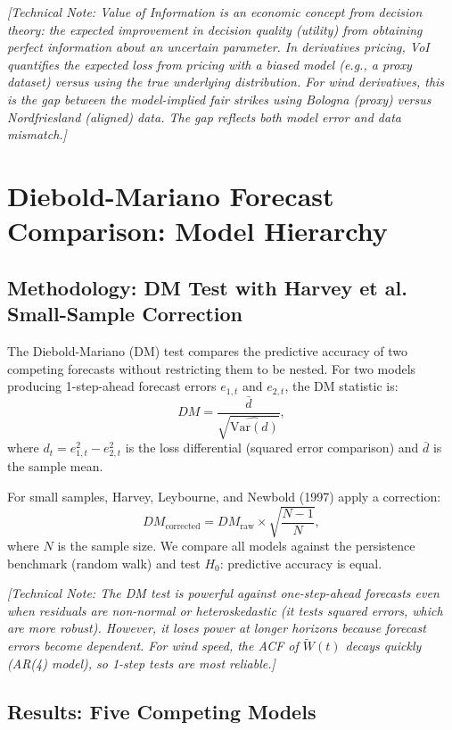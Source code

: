 \documentclass[11pt, a4paper, twoside]{article}
\begin{document}
\textit{[Technical Note: Value of Information is an economic concept from decision theory: the expected improvement in decision quality (utility) from obtaining perfect information about an uncertain parameter. In derivatives pricing, VoI quantifies the expected loss from pricing with a biased model (e.g., a proxy dataset) versus using the true underlying distribution. For wind derivatives, this is the gap between the model-implied fair strikes using Bologna (proxy) versus Nordfriesland (aligned) data. The gap reflects both model error and data mismatch.]}

\section{Diebold-Mariano Forecast Comparison: Model Hierarchy}

\subsection{Methodology: DM Test with Harvey et al. Small-Sample Correction}

The Diebold-Mariano (DM) test compares the predictive accuracy of two competing forecasts without restricting them to be nested. For two models producing 1-step-ahead forecast errors $e_{1,t}$ and $e_{2,t}$, the DM statistic is:
\begin{equation}
DM = \frac{\bar{d}}{\sqrt{\widehat{\text{Var}(d)}}},
\end{equation}
where $d_t = e_{1,t}^2 - e_{2,t}^2$ is the loss differential (squared error comparison) and $\bar{d}$ is the sample mean.

For small samples, Harvey, Leybourne, and Newbold (1997) apply a correction:
\begin{equation}
DM_{\text{corrected}} = DM_{\text{raw}} \times \sqrt{\frac{N-1}{N}},
\end{equation}
where $N$ is the sample size. We compare all models against the persistence benchmark (random walk) and test $H_0$: predictive accuracy is equal.

\textit{[Technical Note: The DM test is powerful against one-step-ahead forecasts even when residuals are non-normal or heteroskedastic (it tests squared errors, which are more robust). However, it loses power at longer horizons because forecast errors become dependent. For wind speed, the ACF of $\tilde{W}(t)$ decays quickly (AR(4) model), so 1-step tests are most reliable.]}

\subsection{Results: Five Competing Models}
\end{document}
